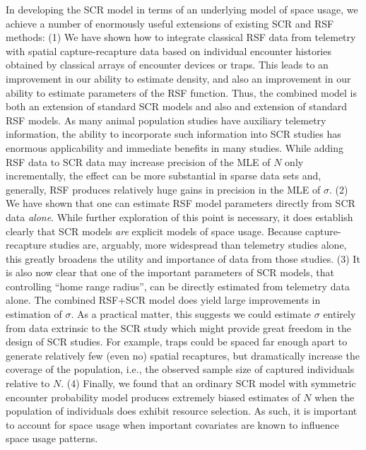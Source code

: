 \documentclass[12pt]{article}
\begin{document}
In developing the SCR model in terms of an underlying model of space
usage, we achieve a number of enormously useful extensions of existing
SCR and RSF methods:
(1) We have shown how to integrate classical RSF data from
telemetry with spatial capture-recapture data based on individual
encounter histories obtained by classical arrays of encounter devices
or traps. This leads to an improvement in our ability to estimate
density, and also an improvement in our ability to estimate parameters
of the RSF function.  Thus, the combined model is both an extension of
standard SCR models and also and extension of standard RSF models. As
many animal population studies have auxiliary telemetry information,
the ability to incorporate such information into SCR studies has
enormous applicability and immediate benefits in many studies.
While adding RSF data to SCR data may increase precision of the MLE of $N$
only incrementally, the effect can be more substantial in sparse data sets
and, generally, RSF produces
relatively huge gains in precision in the MLE of $\sigma$.
(2) We have shown that one can estimate RSF model parameters
directly from SCR data {\it alone}.
While further exploration of this point
is necessary,
it does establish clearly that SCR
models {\it are} explicit models of space usage. Because
capture-recapture studies are, arguably, more widespread than
telemetry studies alone, this greatly broadens the utility and
importance of data from those studies.
(3) It is also now clear
that one of the important parameters of SCR models, that controlling
``home range radius'', can be directly estimated from telemetry data
alone.
The combined RSF+SCR model does yield large improvements in estimation
of $\sigma$. As a practical matter, this suggests we could estimate
$\sigma$ entirely from data extrinsic to the SCR study which might
provide great freedom in the design of SCR studies. For example, traps
could be spaced far enough apart to generate relatively few (even no) spatial recaptures,
but dramatically increase the coverage of the population, i.e., the
observed sample size of captured individuals relative to $N$.
(4) Finally, we found that an
ordinary SCR model with symmetric encounter probability model produces
extremely biased estimates of $N$ when the population of individuals
does exhibit resource selection.  As such, it is important to account
for space usage when important covariates are known to influence
space usage patterns.
\end{document}
